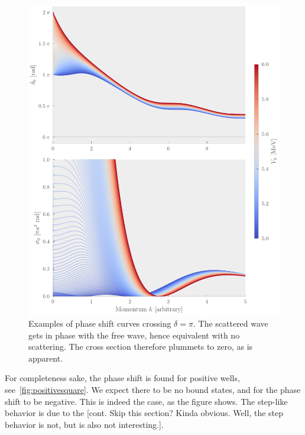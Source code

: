 \begin{figure}[hp]
  \centering
  \includegraphics[]{Figures/square_well_wave_pi.pdf}
  \caption{\label{fig:pizero}Examples of phase shift curves crossing \(\delta =
    \pi\). The scattered wave gets in phase with the free wave, hence equivalent
    with no scattering. The cross section therefore plummets to zero, as is
    apparent.}
\end{figure}

For completeness sake, the phase shift is found for positive wells, see~\cref{fig:positivesquare}. We expect there to be no bound states, and for
the phase shift to be negative. This is indeed the case, as the figure shows.
The step-like behavior is due to the [cont. Skip this section? Kinda obvious.
Well, the step behavior is not, but is also not interesting.].

